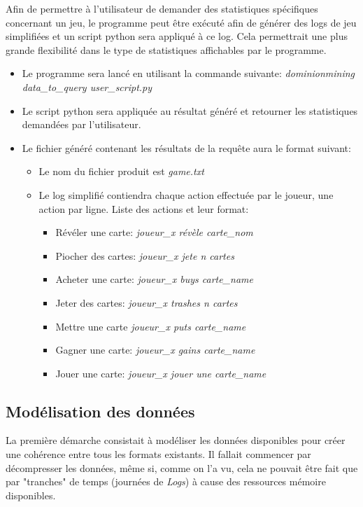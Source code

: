 Afin de permettre à l'utilisateur de demander des statistiques spécifiques concernant un jeu, le programme peut être exécuté afin de générer des logs de jeu simplifiées et un script python sera appliqué à ce log. Cela permettrait une plus grande flexibilité dans le type de statistiques affichables par le programme.
\begin{itemize}
\item Le programme sera lancé en utilisant la commande suivante: \textit{dominionmining data\_to\_query user\_script.py}
 \item Le script python sera appliquée au résultat généré et retourner les statistiques demandées par l'utilisateur.
\item Le fichier généré contenant les résultats de la requête aura le format suivant:
\begin{itemize}
\item Le nom du fichier produit est \textit{game.txt}
\item Le log simplifié contiendra chaque action effectuée par le joueur, une action par ligne. Liste des actions et leur format:
\begin{itemize}
\item Révéler une carte: \textit{joueur\_x révèle carte\_nom}
\item Piocher des cartes: \textit{joueur\_x jete n cartes}
\item Acheter une carte: \textit{joueur\_x buys carte\_name}
\item Jeter des cartes: \textit{joueur\_x trashes n cartes}
\item Mettre une carte \textit{joueur\_x puts carte\_name}
\item Gagner une carte: \textit{joueur\_x gains carte\_name}
\item Jouer une carte: \textit{joueur\_x jouer une carte\_name}

\end{itemize}
\end{itemize}
\end{itemize}
\fi



\subsection{Modélisation des données}
La première démarche consistait à modéliser les données disponibles pour créer une cohérence entre tous les formats existants. Il fallait commencer par décompresser les données, même si, comme on l'a vu, cela ne pouvait être fait que par "tranches" de temps (journées de \textit{Logs}) à cause des ressources mémoire disponibles. 

